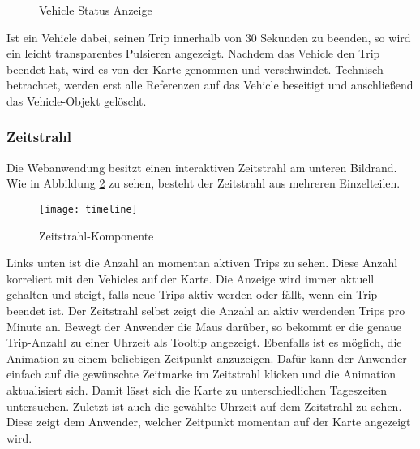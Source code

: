     \begin{figure}[htbp]
      \centering
      \hfill
      \caption{Vehicle Status Anzeige}
      \label{fig:vehicle_states}
    \end{figure}
    
    Ist ein Vehicle dabei, seinen Trip innerhalb von 30 Sekunden zu beenden, so wird ein leicht transparentes Pulsieren angezeigt. Nachdem das Vehicle den Trip beendet hat, wird es von der Karte genommen und verschwindet. Technisch betrachtet, werden erst alle Referenzen auf das Vehicle beseitigt und anschließend das Vehicle-Objekt gelöscht.
    

  \subsubsection*{Zeitstrahl}
  \label{ssub:zeitstrahl}
    Die Webanwendung besitzt einen interaktiven Zeitstrahl am unteren Bildrand. Wie in Abbildung \ref{fig:timeline} zu sehen, besteht der Zeitstrahl aus mehreren Einzelteilen. 

    \begin{figure}[htbp]
      \begin{center}
        \texttt{[image: timeline]}
        \caption{Zeitstrahl-Komponente}
        \label{fig:timeline}
      \end{center}
    \end{figure}

    Links unten ist die Anzahl an momentan aktiven Trips zu sehen. Diese Anzahl korreliert mit den Vehicles auf der Karte. Die Anzeige wird immer aktuell gehalten und steigt, falls neue Trips aktiv werden oder fällt, wenn ein Trip beendet ist. Der Zeitstrahl selbst zeigt die Anzahl an aktiv werdenden Trips pro Minute an. Bewegt der Anwender die Maus darüber, so bekommt er die genaue Trip-Anzahl zu einer Uhrzeit als Tooltip angezeigt. Ebenfalls ist es möglich, die Animation zu einem beliebigen Zeitpunkt anzuzeigen. Dafür kann der Anwender einfach auf die gewünschte Zeitmarke im Zeitstrahl klicken und die Animation aktualisiert sich. Damit lässt sich die Karte zu unterschiedlichen Tageszeiten untersuchen. Zuletzt ist auch die gewählte Uhrzeit auf dem Zeitstrahl zu sehen. Diese zeigt dem Anwender, welcher Zeitpunkt momentan auf der Karte angezeigt wird.
    
